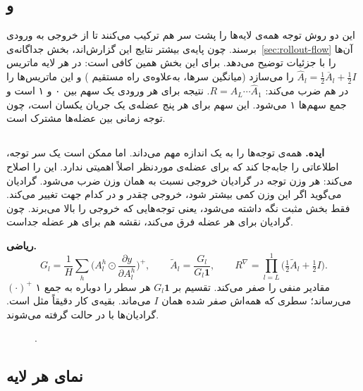 \subsection{ و }

این دو روش توجه همه‌ی لایه‌ها را پشت سر هم ترکیب می‌کنند تا از خروجی به ورودی برسند. چون پایه‌ی بیشتر نتایج این گزارش‌اند، بخش جداگانه‌ی~\ref{sec:rollout-flow} آن‌ها را با جزئیات توضیح می‌دهد. برای این بخش همین کافی است:  در هر لایه ماتریس $\hat A_l=\tfrac12\overline{A}_l+\tfrac12 I$ را می‌سازد (میانگین سرها، به‌علاوه‌ی راه مستقیم ) و این ماتریس‌ها را در هم ضرب می‌کند: $R=\hat A_L\cdots\hat A_1$. نتیجه برای هر  ورودی یک سهم بین ۰ و ۱ است و جمع سهم‌ها ۱ می‌شود. این سهم برای هر پنج عضله‌ی یک جریان یکسان است، چون توجه زمانی بین عضله‌ها مشترک است.

\subsection{}

\textbf{ایده.}  همه‌ی توجه‌ها را به یک اندازه مهم می‌داند. اما ممکن است یک سر توجه، اطلاعاتی را جابه‌جا کند که برای عضله‌ی موردنظر اصلاً اهمیتی ندارد.  \cite{chefer2021} این را اصلاح می‌کند: هر وزن توجه در گرادیان خروجی نسبت به همان وزن ضرب می‌شود. گرادیان می‌گوید اگر این وزن کمی بیشتر شود، خروجی چقدر و در کدام جهت تغییر می‌کند. فقط بخش مثبت نگه داشته می‌شود، یعنی توجه‌هایی که خروجی را بالا می‌برند. چون گرادیان برای هر عضله فرق می‌کند، نقشه هم برای هر عضله جداست.

\textbf{ریاضی.}
\begin{equation}
G_l=\frac1H\sum_h\Big(A^{h}_l\odot\frac{\partial y}{\partial A^{h}_l}\Big)^{+},\qquad
\tilde A_l=\frac{G_l}{G_l\mathbf 1},\qquad
R^{\nabla}=\prod_{l=L}^{1}\Big(\tfrac12\tilde A_l+\tfrac12 I\Big).
\end{equation}
$(\cdot)^{+}$ مقادیر منفی را صفر می‌کند. تقسیم بر $G_l\mathbf 1$ هر سطر را دوباره به جمع ۱ می‌رساند؛ سطری که همه‌اش صفر شده همان $I$ می‌ماند. بقیه‌ی کار دقیقاً مثل  است. گرادیان‌ها با  در حالت  گرفته می‌شوند.

\begin{figure}[htbp]
\centering

\caption{.}
\end{figure}

\subsection{نمای هر لایه}

